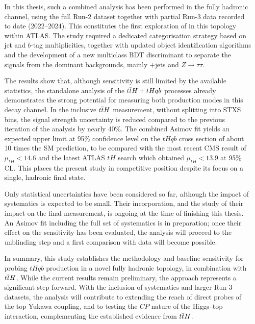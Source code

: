 In this thesis, such a combined analysis has been performed in the fully hadronic \htautau channel, using the full Run-2 dataset together with partial Run-3 data recorded to date (2022–2024). This constitutes the first exploration of \thqb in this topology within ATLAS. The study required a dedicated categorisation strategy based on jet and $b$-tag multiplicities, together with updated object identification algorithms and the development of a new multiclass BDT discriminant to separate the signals from the dominant backgrounds, mainly \ttbar+jets and $Z\to\tau\tau$.  

The results show that, although sensitivity is still limited by the available statistics, the standalone analysis of the \(t\overline{t}H+tHqb\) processes already demonstrates the strong potential for measuring both production modes in this decay channel.  
 In the inclusive \(t\overline{t}H\) measurement, without splitting into STXS bins, the signal strength uncertainty is reduced compared to the previous iteration of the analysis by nearly 40\%. The combined Asimov fit yields an expected upper limit at 95\% confidence level on the \(tHqb\) cross section of about 10 times the SM prediction, to be compared with the most recent CMS result of \(\mu_{tH} < 14.6\) and the latest ATLAS $tH$ search which obtained \(\mu_{tH} < 13.9\) at 95\% CL. This places the present study in competitive position despite its focus on a single, hadronic final state.  

Only statistical uncertainties have been considered so far, although the impact of systematics is expected to be small. Their incorporation, and the study of their impact on the final measurement, is ongoing at the time of finishing this thesis. An Asimov fit including the full set of systematics is in preparation; once their effect on the sensitivity has been evaluated, the analysis will proceed to the unblinding step and a first comparison with data will become possible.  

In summary, this study establishes the methodology and baseline sensitivity for probing \(tHqb\) production in a novel fully hadronic \htautau topology, in combination with \(t\overline{t}H\). While the current results remain preliminary, the approach represents a significant step forward. With the inclusion of systematics and larger Run-3 datasets, the analysis will contribute to extending the reach of direct probes of the top Yukawa coupling, and to testing the $CP$ nature of the Higgs–top interaction, complementing the established evidence from \(t\overline{t}H\).  
